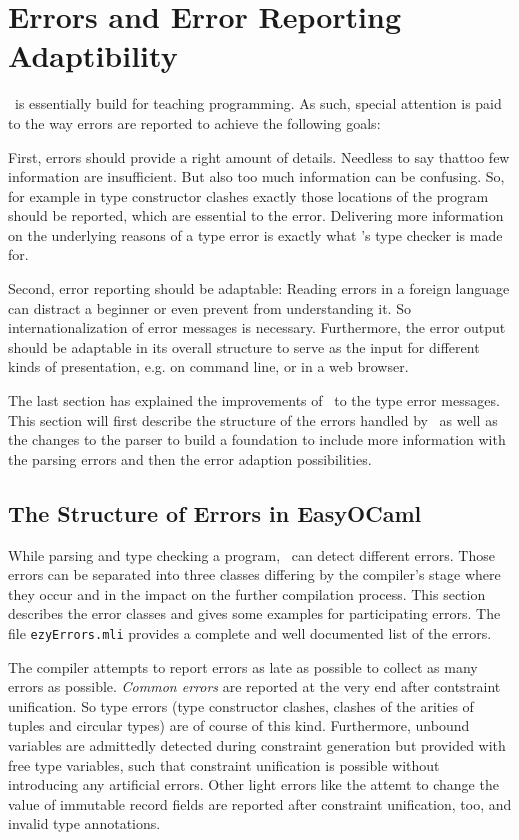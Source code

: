 
\section{Errors and Error Reporting Adaptibility}
\label{sec:errors}

\easyocaml\ is essentially build for teaching programming.
As such, special attention is paid to the way errors are reported to achieve
the following goals:

First, errors should provide a right amount of details. Needless to say thattoo
few information are insufficient. But also too much information can be
confusing. So, for example in type constructor clashes exactly those locations
of the program should be reported, which are essential to the error.
Delivering more information on the underlying reasons of a type error is
exactly what \easyocaml's type checker is made for.

Second, error reporting should be adaptable: Reading errors in a foreign
language can distract a beginner or even prevent from understanding it.
So internationalization of error messages is necessary.
Furthermore, the error output should be adaptable in its overall structure to
serve as the input for different kinds of presentation, e.g. 
on command line, or in a web browser.

The last section has explained the improvements of \easyocaml\ to the type
error messages. This section will first describe the structure  of the errors
handled by
\easyocaml\ as well as the changes to the parser to build a foundation to
include more information with the parsing errors and then the error
adaption possibilities.

\subsection{The Structure of Errors in EasyOCaml}
\label{sec:easyerrors}

While parsing and type checking a program, \easyocaml\ can detect different errors.
Those errors can be separated into three classes differing by the compiler's
stage where they occur and in the impact on the further compilation process.
This section describes the error classes and gives some examples for
participating errors.  The file \texttt{ezyErrors.mli} provides a complete and
well documented list of the errors.

The compiler attempts to report errors as late as possible to collect as many
errors as possible. \emph{Common errors} are reported at the very end after
contstraint unification. So type errors (type constructor clashes, clashes of
the arities of tuples and circular types) are of course of this kind.
Furthermore, unbound variables are admittedly detected during constraint
generation but provided with free type variables, such that constraint
unification is possible without introducing any artificial errors.
Other light errors like the attemt to change the value of immutable record
fields are reported after constraint unification, too, and invalid type
annotations.

